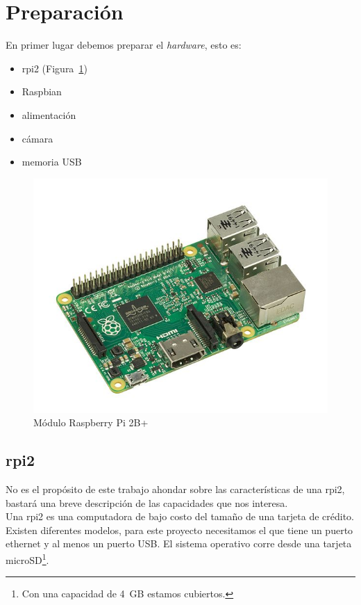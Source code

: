 \documentclass[10pt,a4paper]{article}
\begin{document}
\section{Preparaci\'on}

En primer lugar debemos preparar el \emph{hardware}, esto es:
\begin{itemize}
    \item rpi2 (Figura~\ref{fig:rpi2})
    \item Raspbian
    \item alimentaci\'on
    \item c\'amara
    \item memoria USB
\end{itemize}

\begin{figure}
\centering
    \includegraphics{Raspberry-Pi-2-Bare.jpg}
    \caption{M\'odulo Raspberry Pi 2B+}
    \label{fig:rpi2}
\end{figure}

\subsection{rpi2}

No es el prop\'osito de este trabajo ahondar sobre las caracter\'isticas de una rpi2, bastar\'a una breve descripci\'on de las capacidades que nos interesa.\\

Una rpi2 es una computadora de bajo costo del tama\~no de una tarjeta de cr\'edito. Existen diferentes modelos, para este proyecto necesitamos el que tiene un puerto ethernet y al menos un puerto USB. El sistema operativo corre desde una tarjeta microSD\footnote{Con una capacidad de \SI{4}{GB} estamos cubiertos.}.\\
\end{document}
